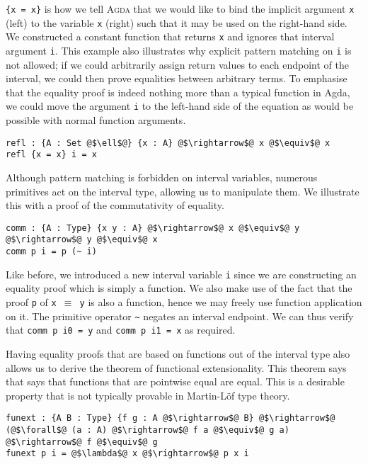\documentclass[12pt,twoside,maitrise]{dms}
\theoremstyle{definition}
\numberwithin{equation}{section}
\numberwithin{table}{chapter}
\numberwithin{figure}{chapter}
\newcommand\id[1] {\texttt{#1}}
\newcommand\fn[1] {\texttt{#1}}
\def\Agda{\textsc{Agda}\xspace}
\begin{document}
\fn{\{x = x\}} is how we tell \Agda{} that we would like to bind the implicit
argument \id{x} (left) to the variable \id{x} (right) such that it may be used
on the right-hand side. We constructed a constant function that returns \id{x}
and ignores that interval argument \id{i}. This example also illustrates why
explicit pattern matching on \id{i} is not allowed; if we could arbitrarily
assign return values to each endpoint of the interval, we could then prove
equalities between arbitrary terms. To emphasise that the equality proof is
indeed nothing more than a typical function in Agda, we could move the argument
\id{i} to the left-hand side of the equation as would be possible with normal
function arguments.

\begin{verbatim}
refl : {A : Set @$\ell$@} {x : A} @$\rightarrow$@ x @$\equiv$@ x
refl {x = x} i = x
\end{verbatim}

Although pattern matching is forbidden on interval variables, numerous primitives
act on the interval type, allowing us to manipulate them. We illustrate this with
a proof of the commutativity of equality.

\begin{verbatim}
comm : {A : Type} {x y : A} @$\rightarrow$@ x @$\equiv$@ y @$\rightarrow$@ y @$\equiv$@ x
comm p i = p (~ i)
\end{verbatim}

Like before, we introduced a new interval variable \id{i} since we are
constructing an equality proof which is simply a function. We also make use of
the fact that the proof \id{p} of \fn{x $\equiv$ y} is also a function, hence we
may freely use function application on it. The primitive operator \id{\~{}}
negates an interval endpoint. We can thus verify that \fn{comm p i0 = y} and
\fn{comm p i1 = x} as required.

Having equality proofs that are based on functions out of the interval type also
allows us to derive the theorem of functional extensionality. This theorem says
that says that functions that are pointwise equal are equal. This is a desirable
property that is not typically provable in Martin-Löf type
theory\cite{martin1975intuitionistic}.

\begin{verbatim}
funext : {A B : Type} {f g : A @$\rightarrow$@ B} @$\rightarrow$@ (@$\forall$@ (a : A) @$\rightarrow$@ f a @$\equiv$@ g a) @$\rightarrow$@ f @$\equiv$@ g
funext p i = @$\lambda$@ x @$\rightarrow$@ p x i
\end{verbatim}
\end{document}
